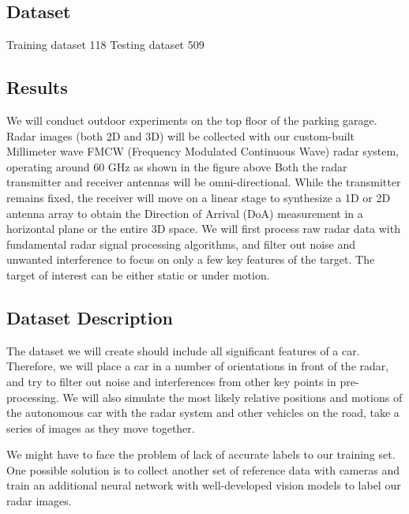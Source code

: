 \subsection{}

\subsection{Dataset}
Training dataset 118 
Testing dataset 509

\subsection{Results}


\iffalse
We will conduct outdoor experiments on the top floor of the parking garage. Radar images (both 2D and 3D) will be collected with our custom-built Millimeter wave FMCW (Frequency Modulated Continuous Wave) radar system, operating around 60 GHz as shown in the figure above Both the radar transmitter and receiver antennas will be omni-directional. While the transmitter remains fixed, the receiver will move on a linear stage to synthesize a 1D or 2D antenna array to obtain the Direction of Arrival (DoA) measurement in a horizontal plane or the entire 3D space. We will first process raw radar data with fundamental radar signal processing algorithms, and filter out noise and unwanted interference to focus on only a few key features of the target. The target of interest can be either static or under motion. 

\subsection{Dataset Description}
The dataset we will create should include all significant features of a car. Therefore, we will place a car in a number of orientations in front of the radar, and try to filter out noise and interferences from other key points in pre-processing. We will also simulate the most likely relative positions and motions of the autonomous car with the radar system and other vehicles on the road, take a series of images as they move together.
\par We might have to face the problem of lack of accurate labels to our training set. One possible solution is to collect another set of reference data with cameras and train an additional neural network with well-developed vision models to label our radar images.

